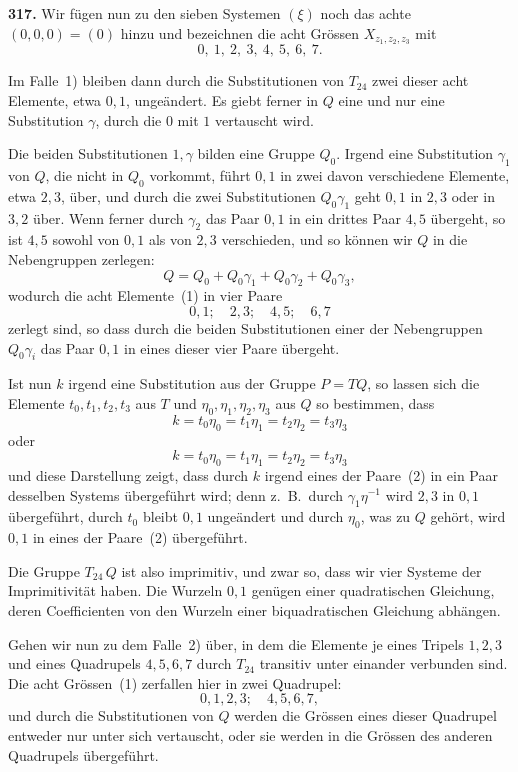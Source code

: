 \documentclass[12pt,a4paper]{article}
\begin{document}
\bigskip
\noindent\textbf{317.} Wir f\"ugen nun zu den sieben Systemen $(\xi)$ noch das achte $(0,0,0)=(0)$ hinzu und bezeichnen die acht Gr\"ossen $X_{z_1,z_2,z_3}$ mit
\begin{equation}
\tag{1}
0,\ 1,\ 2,\ 3,\ 4,\ 5,\ 6,\ 7.
\end{equation}

Im Falle~1) bleiben dann durch die Substitutionen von $T_{24}$ zwei dieser acht Elemente, etwa $0,1$, unge\"andert. Es giebt ferner in $Q$ eine und nur eine Substitution $\gamma$, durch die $0$ mit $1$ vertauscht wird.

Die beiden Substitutionen $1,\gamma$ bilden eine Gruppe $Q_0$. Irgend eine Substitution $\gamma_1$ von $Q$, die nicht in $Q_0$ vorkommt, f\"uhrt $0,1$ in zwei davon verschiedene Elemente, etwa $2,3$, \"uber, und durch die zwei Substitutionen $Q_0\gamma_1$ geht $0,1$ in $2,3$ oder in $3,2$ \"uber. Wenn ferner durch $\gamma_2$ das Paar $0,1$ in ein drittes Paar $4,5$ \"ubergeht, so ist $4,5$ sowohl von $0,1$ als von $2,3$ verschieden, und so k\"onnen wir $Q$ in die Nebengruppen zerlegen:
\[
Q = Q_0 + Q_0\gamma_1 + Q_0\gamma_2 + Q_0\gamma_3,
\]
wodurch die acht Elemente~(1) in vier Paare
\begin{equation}
\tag{2}
0,1;\quad 2,3;\quad 4,5;\quad 6,7
\end{equation}
zerlegt sind, so dass durch die beiden Substitutionen einer der Nebengruppen $Q_0\gamma_i$ das Paar $0,1$ in eines dieser vier Paare \"ubergeht.

Ist nun $k$ irgend eine Substitution aus der Gruppe $P=TQ$, so lassen sich die Elemente $t_0,t_1,t_2,t_3$ aus $T$ und $\eta_0,\eta_1,\eta_2,\eta_3$ aus $Q$ so bestimmen, dass
\[
k = t_0\eta_0 = t_1\eta_1 = t_2\eta_2 = t_3\eta_3
\]
oder
\[
k = t_0\eta_0 = t_1\eta_1 = t_2\eta_2 = t_3\eta_3
\]
und diese Darstellung zeigt, dass durch $k$ irgend eines der Paare~(2) in ein Paar desselben Systems \"ubergef\"uhrt wird; denn z.~B.\ durch $\gamma_1\eta^{-1}$ wird $2,3$ in $0,1$ \"ubergef\"uhrt, durch $t_0$ bleibt $0,1$ unge\"andert und durch $\eta_0$, was zu $Q$ geh\"ort, wird $0,1$ in eines der Paare~(2) \"ubergef\"uhrt.

Die Gruppe $T_{24}\,Q$ ist also imprimitiv, und zwar so, dass wir vier Systeme der Imprimitivit\"at haben. Die Wurzeln $0,1$ gen\"ugen einer quadratischen Gleichung, deren Coefficienten von den Wurzeln einer biquadratischen Gleichung abh\"angen.

Gehen wir nun zu dem Falle~2) \"uber, in dem die Elemente je eines Tripels $1,2,3$ und eines Quadrupels $4,5,6,7$ durch $T_{24}$ transitiv unter einander verbunden sind. Die acht Gr\"ossen~(1) zerfallen hier in zwei Quadrupel:
\begin{equation}
\tag{3}
0,1,2,3;\quad 4,5,6,7,
\end{equation}
und durch die Substitutionen von $Q$ werden die Gr\"ossen eines dieser Quadrupel entweder nur unter sich vertauscht, oder sie werden in die Gr\"ossen des anderen Quadrupels \"ubergef\"uhrt.
\end{document}
